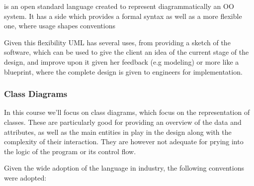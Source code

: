 	\par{ is an open standard language created to represent
			diagrammatically an OO system. It has a  side which
			provides a formal syntax as well as a more flexible
	 one, where usage shapes conventions}
	\par{Given this flexibility UML has several uses, from providing a sketch of
		 the software, which can be used to give the client an idea of the
		 current stage of the design, and improve upon it given her feedback
		 (e.g  modeling) or more like a blueprint, where the complete
 design is given to engineers for implementation.}
	
 \subsubsection{Class Diagrams}

	\par{ In this course we'll focus on class diagrams, which focus on the
	representation of classes. These are particularly good for providing an
	overview of the data and attributes, as well as the main entities in play in
	the design along with the complexity of their interaction. They are however
	not adequate for prying into the logic of the program or its control flow.}
	
	\par{Given the wide adoption of the language in industry, the following
	conventions were adopted:}

